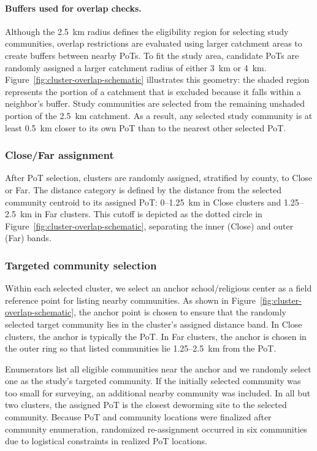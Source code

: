 \paragraph{Buffers used for overlap checks.}
Although the 2.5~km radius defines the eligibility region for selecting study communities, overlap restrictions are
evaluated using larger catchment areas to create buffers between nearby PoTs. To fit the study area, candidate PoTs are randomly assigned a larger catchment radius of either 3~km or 4~km. Figure~\ref{fig:cluster-overlap-schematic} illustrates this geometry: the shaded region represents the portion of a catchment that is excluded because it falls within a neighbor's buffer. Study communities are selected from the remaining unshaded portion of the 2.5~km catchment. As a result, any selected study community is at least 0.5~km closer to its own PoT than to the nearest other selected PoT.

\subsubsection*{Close/Far assignment}

After PoT selection, clusters are randomly assigned, stratified by county, to Close or Far. The distance category is defined by the distance from the selected community centroid to its assigned PoT: 0--1.25~km in Close clusters and 1.25--2.5~km in Far clusters. This cutoff is depicted as the dotted circle in Figure~\ref{fig:cluster-overlap-schematic}, separating the inner (Close) and outer (Far) bands.%

\subsubsection*{Targeted community selection}
Within each selected cluster, we select an anchor school/religious center as a field reference point for listing nearby communities. As shown in Figure~\ref{fig:cluster-overlap-schematic}, the anchor point is chosen to ensure that the randomly selected target community lies in the cluster's assigned distance band. In Close clusters, the anchor is typically the PoT. In Far clusters, the anchor is chosen in the outer ring so that listed communities lie 1.25--2.5~km from the PoT.

Enumerators list all eligible communities near the anchor and we randomly select one as the study's targeted community. If the initially selected community was too small for surveying, an additional nearby community was included. In all but two clusters, the assigned PoT is the closest deworming site to the selected community. Because PoT and community locations were finalized after community enumeration, randomized re-assignment occurred in six communities due to logistical constraints in realized PoT locations.

